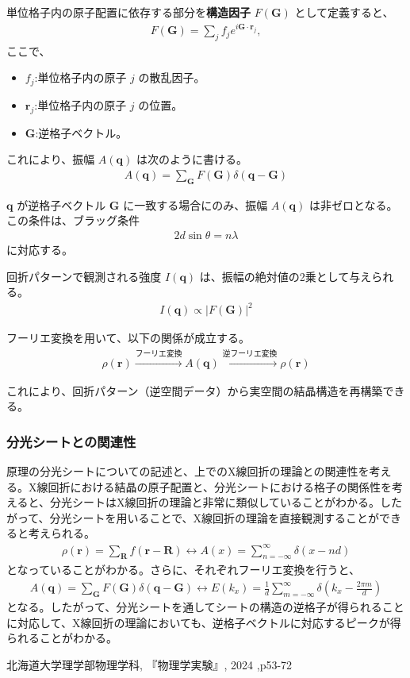 \documentclass[a4paper,11pt]{jsarticle}
\begin{document}
単位格子内の原子配置に依存する部分を\textbf{構造因子} \(F(\bm{G})\) として定義すると、
\begin{align}
    F(\bm{G}) = \sum_j f_j e^{i \bm{G} \cdot \bm{r}_j},
\end{align}
ここで、
\begin{itemize}
    \item \(f_j\):単位格子内の原子 \(j\) の散乱因子。
    \item \(\bm{r}_j\):単位格子内の原子 \(j\) の位置。
    \item \(\bm{G}\):逆格子ベクトル。
\end{itemize}

これにより、振幅 \(A(\bm{q})\) は次のように書ける。
\begin{align}
    A(\bm{q}) = \sum_{\bm{G}} F(\bm{G}) \delta(\bm{q} - \bm{G})
\end{align}

\(\bm{q}\) が逆格子ベクトル \(\bm{G}\) に一致する場合にのみ、振幅 \(A(\bm{q})\) は非ゼロとなる。この条件は、ブラッグ条件
\begin{align}
    2d \sin\theta = n\lambda
\end{align}
に対応する。

回折パターンで観測される強度 \(I(\bm{q})\) は、振幅の絶対値の2乗として与えられる。
\begin{align}
    I(\bm{q}) \propto \left| F(\bm{G}) \right|^2
\end{align}

フーリエ変換を用いて、以下の関係が成立する。
\begin{align}
    \rho(\bm{r}) \xrightarrow{\text{フーリエ変換}} A(\bm{q}) \xrightarrow{\text{逆フーリエ変換}} \rho(\bm{r})
\end{align}

これにより、回折パターン（逆空間データ）から実空間の結晶構造を再構築できる。

\subsubsection{分光シートとの関連性}
原理の分光シートについての記述と、上でのX線回折の理論との関連性を考える。X線回折における結晶の原子配置と、分光シートにおける格子の関係性を考えると、分光シートはX線回折の理論と非常に類似していることがわかる。したがって、分光シートを用いることで、X線回折の理論を直接観測することができると考えられる。
\begin{align}
  \rho(\bm{r}) = \sum_{\bm{R}} f(\bm{r} - \bm{R}) \leftrightarrow A(x) = \sum_{n=-\infty}^\infty \delta(x - n d)
\end{align}
となっていることがわかる。さらに、それぞれフーリエ変換を行うと、
\begin{align}
  A(\bm{q}) = \sum_{\bm{G}} F(\bm{G}) \delta(\bm{q} - \bm{G}) \leftrightarrow E(k_x) = \frac{1}{d} \sum_{m=-\infty}^\infty \delta\left(k_x - \frac{2\pi m}{d}\right)
\end{align}
となる。したがって、分光シートを通してシートの構造の逆格子が得られることに対応して、X線回折の理論においても、逆格子ベクトルに対応するピークが得られることがわかる。





\begin{thebibliography}{99}
   北海道大学理学部物理学科, 『物理学実験』, 2024 ,p53-72
\end{thebibliography}
\end{document}

